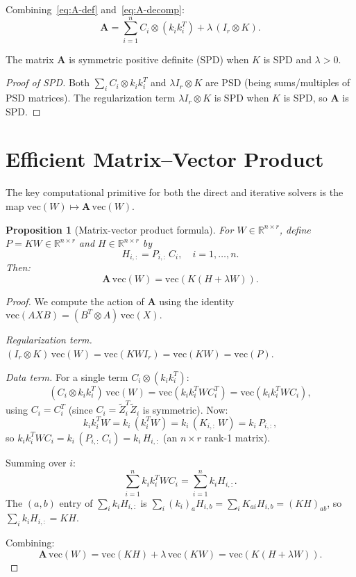 \documentclass[12pt]{article}
\newtheorem{proposition}{Proposition}
\theoremstyle{definition}
\begin{document}
Combining~\eqref{eq:A-def} and~\eqref{eq:A-decomp}:
\begin{equation}\label{eq:A-reform}
\mathbf{A} = \sum_{i=1}^n C_i \otimes (k_i k_i^T) + \lambda\,(I_r \otimes K).
\end{equation}

The matrix $\mathbf{A}$ is symmetric positive definite (SPD) when $K$ is SPD and $\lambda > 0$.

\begin{proof}[Proof of SPD]
Both $\sum_i C_i \otimes k_ik_i^T$ and $\lambda I_r \otimes K$ are PSD (being sums/multiples of PSD matrices). The regularization term $\lambda I_r \otimes K$ is SPD when $K$ is SPD, so $\mathbf{A}$ is SPD.
\end{proof}

\section{Efficient Matrix--Vector Product}\label{sec:matvec}

The key computational primitive for both the direct and iterative solvers is the map $\mathrm{vec}(W) \mapsto \mathbf{A}\,\mathrm{vec}(W)$.

\begin{proposition}[Matrix-vector product formula]\label{prop:matvec}
For $W \in \mathbb{R}^{n \times r}$, define $P = KW \in \mathbb{R}^{n \times r}$ and $H \in \mathbb{R}^{n \times r}$ by
\[
H_{i,:} = P_{i,:}\,C_i, \quad i = 1, \dots, n.
\]
Then:
\begin{equation}\label{eq:matvec}
\mathbf{A}\,\mathrm{vec}(W) = \mathrm{vec}\!\left(K(H + \lambda W)\right).
\end{equation}
\end{proposition}

\begin{proof}
We compute the action of $\mathbf{A}$ using the identity $\mathrm{vec}(AXB) = (B^T \otimes A)\,\mathrm{vec}(X)$.

\textit{Regularization term.} $(I_r \otimes K)\,\mathrm{vec}(W) = \mathrm{vec}(KWI_r) = \mathrm{vec}(KW) = \mathrm{vec}(P)$.

\textit{Data term.} For a single term $C_i \otimes (k_ik_i^T)$:
\[
(C_i \otimes k_ik_i^T)\,\mathrm{vec}(W) = \mathrm{vec}(k_ik_i^T W C_i^T) = \mathrm{vec}(k_ik_i^T W C_i),
\]
using $C_i = C_i^T$ (since $C_i = \tilde{Z}_i^T\tilde{Z}_i$ is symmetric). Now:
\[
k_ik_i^T W = k_i\,(k_i^T W) = k_i\,(K_{i,:}\,W) = k_i\,P_{i,:},
\]
so $k_ik_i^T W C_i = k_i\,(P_{i,:}\,C_i) = k_i\,H_{i,:}$ (an $n \times r$ rank-1 matrix).

Summing over $i$:
\[
\sum_{i=1}^n k_ik_i^T W C_i = \sum_{i=1}^n k_i H_{i,:}.
\]
The $(a,b)$ entry of $\sum_i k_i H_{i,:}$ is $\sum_i (k_i)_a H_{i,b} = \sum_i K_{ai} H_{i,b} = (KH)_{ab}$, so $\sum_i k_iH_{i,:} = KH$.

Combining:
\[
\mathbf{A}\,\mathrm{vec}(W) = \mathrm{vec}(KH) + \lambda\,\mathrm{vec}(KW) = \mathrm{vec}(K(H + \lambda W)).
\]
\end{proof}
\end{document}

